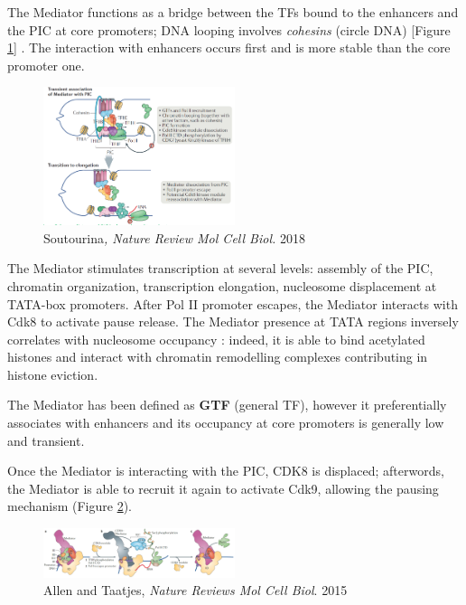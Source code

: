 The Mediator functions as a bridge between the TFs bound to the enhancers and the PIC at core promoters; DNA looping involves \emph{cohesins} (circle DNA) [Figure \ref{fig:cohesin}] . The interaction with enhancers occurs first and is more stable than the core promoter one.

\begin{figure}
\centering
\includegraphics[width=0.5\textwidth]{../_resources/Screenshot_2022-10-07_at_10-54-13.png}
\caption{Soutourina\emph{, Nature Review Mol Cell Biol.} 2018}
\label{fig:cohesin}
\end{figure}

The Mediator stimulates transcription at several levels: assembly of the PIC, chromatin organization, transcription elongation, nucleosome displacement at TATA-box promoters. After Pol II promoter escapes, the Mediator interacts with Cdk8 to activate pause release. The Mediator presence at TATA regions inversely correlates with nucleosome occupancy : indeed, it is able to bind acetylated histones and interact with chromatin remodelling complexes contributing in histone eviction.

The Mediator has been defined as \textbf{GTF} (general TF), however it preferentially associates with enhancers and its occupancy at core promoters is generally low and transient.

Once the Mediator is interacting with the PIC, CDK8 is displaced; afterwords, the Mediator is able to recruit it again to activate Cdk9, allowing the pausing mechanism (Figure \ref{fig:cdk9}).

\begin{figure}
\centering
\includegraphics[width=0.5\textwidth]{../_resources/Screenshot_2022-10-10_at_11-03-13.png}
\caption{Allen and Taatjes, \emph{Nature Reviews Mol Cell Biol}. 2015}
\label{fig:cdk9}
\end{figure}

